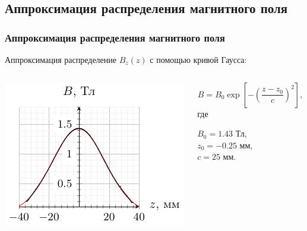 \documentclass[10pt,pdf,hyperref={unicode}, dvipsnames]{beamer}
\begin{document}
\begin{frame}
	\subsection{Аппроксимация распределения магнитного поля}
	\frametitle{Аппроксимация распределения магнитного поля}
	Аппроксимация распределение $B_z(z)$ с помощью кривой Гаусса:\vspace{-1em}
	\begin{columns}
		\begin{column}{0.6\textwidth}
			\begin{center}
				\hspace{4em}
				\includegraphics[width=\textwidth]{images/b_from_z}
			\end{center}
		\end{column}
		\begin{column}[]{0.4\textwidth}
			\begin{equation*} 
				B=B_0%
				\exp 
				\left[
					-\left(
					\frac{z-z_0}{c}
					\right)^2
					\right], 
			\end{equation*}
			где 
			
			$B_0=1.43$ Тл, \\
			$z_0=-0.25$ мм,\\
			$c=25$ мм.
		\end{column}
	\end{columns}
\end{frame}
\end{document}
